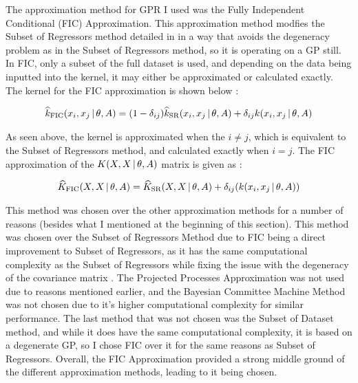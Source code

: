\documentclass{article}
\newcommand{\vbar}{\hspace{-0.4mm} \mathrel{|} \hspace{-0.4mm}}
\begin{document}
    The approximation method for GPR I used was the Fully Independent Conditional (FIC)
    Approximation. This approximation method modfies the Subset of Regressors method detailed
    in \citep{gpml} in a way that avoids the degeneracy problem as in the Subset of Regressors
    method, so it is operating on a GP still. In FIC, only a subset of the full dataset is used,
    and depending on the data being inputted into the kernel, it may either be approximated or
    calculated exactly. The kernel for the FIC approximation is shown below \citep{fic}:
    
    \begin{align*}
        \widehat{k}_{\text{FIC}}(x_{i}, x_{j} \vbar \theta, A) = (1 - \delta_{ij})\widehat{k}_{\text{SR}}(x_{i}, x_{j} \vbar \theta, A) + \delta_{ij} k(x_{i}, x_{j} \vbar \theta, A)
    \end{align*}
    
    As seen above, the kernel is approximated when the $i \neq j$, which is equivalent to the
    Subset of Regressors method, and calculated exactly when $i = j$. The FIC
    approximation of the $K(X, X \vbar \theta, A)$ matrix is given as \citep{fic_matlab}:
    
    \begin{align*}
        \widehat{K}_{\text{FIC}}(X, X  \vbar \theta, A) = \widehat{K}_{\text{SR}}(X, X  \vbar \theta, A) + \delta_{ij}(k(x_{i}, x_{j} \vbar \theta, A)) 
    \end{align*}
    
    This method was chosen over the other approximation methods for a number
    of reasons (besides what I mentioned at the beginning of this section).
    This method was chosen over the Subset of Regressors Method due to FIC being a direct
    improvement to Subset of Regressors, as it has the same computational complexity as the Subset
    of Regressors while fixing the issue with the degeneracy of the covariance matrix \citep{fic}.
    The Projected Processes Approximation was not used due to reasons mentioned earlier, and the
    Bayesian Committee Machine Method was not chosen due to it's higher computational complexity
    for similar performance. The last method that was not chosen was the Subset of Dataset method,
    and while it does have the same computational complexity, it is based on a degenerate GP, so I
    chose FIC over it for the same reasons as Subset of Regressors. Overall, the FIC Approximation
    provided a strong middle ground of the different approximation methods, leading to it being
    chosen.
    
\end{document}
